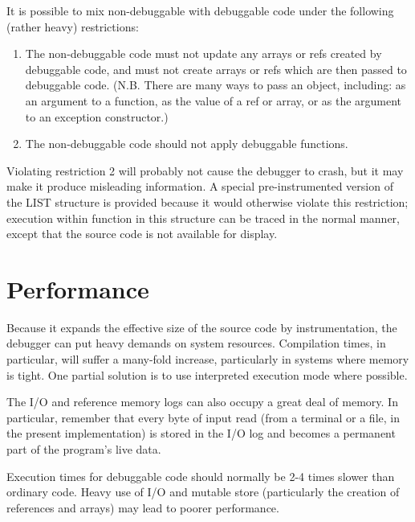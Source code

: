 It is possible to mix non-debuggable with debuggable code under the
following (rather heavy) restrictions:
\begin{enumerate}
  \item The non-debuggable code must not update any arrays or refs created by
debuggable code, and must not create arrays or refs which are then passed
to debuggable code.  (N.B. There are many ways to pass an object, including:
as an argument to a function, as the value of a ref or array, or as the
argument to an exception constructor.)
  \item The non-debuggable code should not apply debuggable functions. 
\end{enumerate}
Violating restriction 2 will probably not cause the debugger to crash, but
it may make it produce misleading information.  A special pre-instrumented 
version of the LIST structure is provided because it would otherwise violate
this restriction; execution within function in this structure can be traced
in the normal manner, except that the source code is not available for display.

\section{Performance}
Because it expands the effective size of the source code by instrumentation,
the debugger can put heavy demands on system resources.  Compilation times,
in particular, will suffer a many-fold increase, particularly in systems
where memory is tight.  One partial solution is to use interpreted execution 
mode where possible.

The I/O and reference memory logs can also occupy a great deal of memory. In
particular, remember that every byte of input read (from a terminal or
a file, in the present implementation) is stored in the I/O log and 
becomes a permanent part of the program's live data.

Execution times for debuggable code should normally be 2-4 times slower than
ordinary code.  Heavy use of I/O and mutable store (particularly the creation
of references and arrays) may lead to poorer performance.


